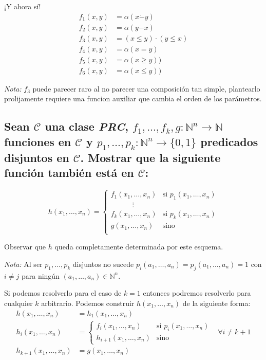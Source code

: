 \documentclass[fleqn, 11pt]{article}
\newcommand{\nat}{\mathbb{N}}
\newcommand{\Ccur}{\mathcal{C}}
\begin{document}
¡Y ahora sí!
\begin{align*}
	f_1(x, y) &= \alpha(x\dot-y) \\
	f_2(x, y) &= \alpha(y\dot-x) \\
	f_3(x, y) &= (x \leq y) \cdot (y \leq x) \\
	f_4(x, y) &= \alpha(x = y) \\
	f_5(x, y) &= \alpha(x \geq y)) \\
	f_6(x, y) &= \alpha(x \leq y))
\end{align*}

\emph{Nota:} $f_3$ puede parecer raro al no parecer una composición tan simple,
plantearlo prolijamente requiere una funcion auxiliar que cambia el orden de
los parámetros.

\subsection{Sean $\Ccur$ una clase \emph{PRC}, $f_1, \dots, f_k,
g:\nat^n\to\nat$ funciones en $\Ccur$ y $p_1, \dots, p_k: \nat^n \to \{0, 1\}$
predicados disjuntos en $\Ccur$. Mostrar que la siguiente función también está
en $\Ccur$:}

\[
	h(x_1, \dots, x_n) =
	\begin{cases}
		f_1(x_1, \dots, x_n) & \text{si } p_1(x_1, \dots, x_n) \\
		\hspace{3em}\vdots \\
		f_k(x_1, \dots, x_n) & \text{si } p_k(x_1, \dots, x_n) \\
		g(x_1, \dots, x_n) & \text{sino} \\
	\end{cases}
\]

Observar que $h$ queda completamente determinada por este esquema.

\emph{Nota:} Al ser $p_1, \dots, p_k$ disjuntos no sucede $p_i(a_1, \dots, a_n)
= p_j(a_1, \dots, a_n) = 1$ con $i \neq j$ para ningún
$(a_1, \dots, a_n) \in \nat^n$.

Si podemos resolverlo para el caso de $k=1$ entonces podremos resolverlo para
cualquier $k$ arbitrario. Podemos construir $h(x_1, \dots, x_n)$ de la
siguiente forma:
\begin{align*}
	h(x_1, \dots, x_n)   &= h_1(x_1, \dots, x_n) \\
	h_i(x_1, \dots, x_n) &=
	\begin{cases}
		f_i(x_1, \dots, x_n) & \text{si } p_i(x_1, \dots, x_n) \\
		h_{i + 1}(x_1, \dots, x_n) & \text{sino}
	\end{cases} & \forall i \neq k+1 \\
	h_{k + 1}(x_1, \dots, x_n) &= g(x_1, \dots, x_n)
\end{align*}
\end{document}
